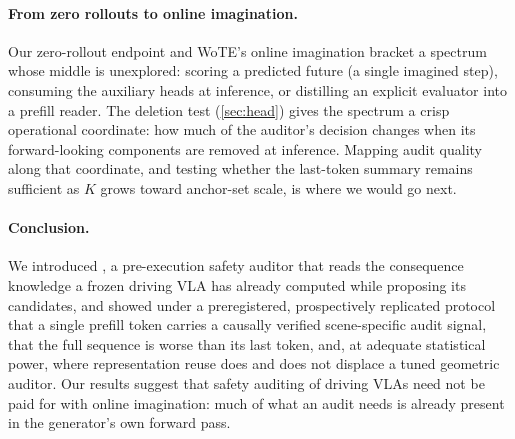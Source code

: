 \paragraph{From zero rollouts to online imagination.}
Our zero-rollout endpoint and WoTE's online imagination bracket a spectrum whose middle is unexplored: scoring a predicted future (a single imagined step), consuming the auxiliary heads at inference, or distilling an explicit evaluator into a prefill reader.
The deletion test (\cref{sec:head}) gives the spectrum a crisp operational coordinate: how much of the auditor's decision changes when its forward-looking components are removed at inference.
Mapping audit quality along that coordinate, and testing whether the last-token summary remains sufficient as $K$ grows toward anchor-set scale, is where we would go next.

\paragraph{Conclusion.}
We introduced \headname{}, a pre-execution safety auditor that reads the consequence knowledge a frozen driving VLA has already computed while proposing its candidates, and showed under a preregistered, prospectively replicated protocol that a single prefill token carries a causally verified scene-specific audit signal, that the full sequence is worse than its last token, and, at adequate statistical power, where representation reuse does and does not displace a tuned geometric auditor.
Our results suggest that safety auditing of driving VLAs need not be paid for with online imagination: much of what an audit needs is already present in the generator's own forward pass.
